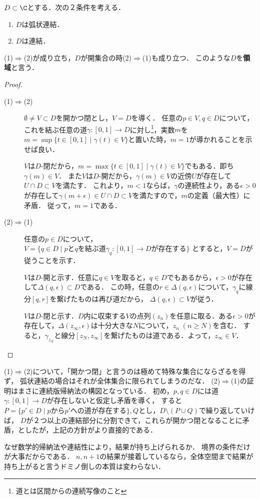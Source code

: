 \documentclass[uplatex, dvipdfmx]{jsreport}
\begin{document}
\begin{lemma}
    $D\subset\C$とする．次の２条件を考える．
    \begin{enumerate}[(1)]
        \item $D$は弧状連結．
        \item $D$は連結．
    \end{enumerate}
    (1)$\Rightarrow$(2)が成り立ち，$D$が開集合の時(2)$\Rightarrow$(1)も成り立つ．
    このような$D$を\textbf{領域}と言う．
\end{lemma}
\begin{proof}\mbox{}
    \begin{description}
        \item[(1)$\Rightarrow$(2)] 
        $\emptyset\ne V\subset D$を開かつ閉とし，$V=D$を導く．
        任意の$p\in V,q\in D$について，これを結ぶ任意の道$\gamma:[0,1]\to D$に対し\footnote{道とは区間からの連続写像のこと}，実数$m$を$m=\sup\{t\in[0,1]\mid\gamma(t)\in V\}$と置いた時，$m=1$が導かれることを示せば良い．

        $V$は$D$-閉だから，$m=\max\{t\in[0,1]\mid\gamma(t)\in V\}$でもある．即ち$\gamma(m)\in V$．
        また$V$は$D$-開だから，$\gamma(m)\in V$の近傍$U$が存在して$U\cap D\subset V$を満たす．
        これより，$m<1$ならば，$\gamma$の連続性より，ある$\epsilon>0$が存在して$\gamma(m+\epsilon)\in U\cap D\subset V$を満たすので，$m$の定義（最大性）に矛盾．
        従って，$m=1$である．
        \item[(2)$\Rightarrow$(1)] 
        任意の$p\in D$について，$V=\{q\in D\mid pとqを結ぶ道\gamma_q:[0,1]\to Dが存在する\}$
        とすると，$V=D$が従うことを示す．

        $V$は$D$-開と示す．任意に$q\in V$を取ると，$q\in D$でもあるから，$\epsilon>0$が存在して$\Delta(q,\epsilon)\subset D$である．
        この時，任意の$r\in\Delta(q,\epsilon)$について，$\gamma_q$に線分$[q,r]$を繋げたものは再び道だから，
        $\Delta(q,\epsilon)\subset V$が従う．

        $V$は$D$-閉と示す．$D$内に収束する$V$の点列$(z_n)$を任意に取る．ある$\epsilon>0$が存在して，$\Delta(z_\infty,\epsilon)$は十分大きな$N$について，$z_n\;(n\ge N)$を含む．
        すると，$\gamma_{z_N}$と線分$[z_N,z_\infty]$を繋げたものは道である．よって，$z_\infty\in V$．
    \end{description}
\end{proof}
\begin{remarks}
    (1)$\Rightarrow$(2)について，「開かつ閉」と言うのは極めて特殊な集合にならざるを得ず，
    弧状連結の場合はそれが全体集合に限られてしまうのだな．
    (2)$\Rightarrow$(1)の証明はまさに連続版帰納法の構図となっている．
    初め，$p,q\in D$には道$\gamma:[0,1]\to D$が存在しないと仮定し矛盾を導く，
    すると$P=\{p'\in D\mid pからp'への道が存在する\},Q$とし，$D\setminus (P\cup Q)$で繰り返していけば，
    $D$が２つ以上の連結部分に分割できて，これらが開かつ閉となることに矛盾，としたが，上記の方針がより直接的である．

    なぜ数学的帰納法や連結性により，結果が持ち上げられるか．
    境界の条件だけが大事だからである．
    $n,n+1$の結果が接着しているなら，全体空間まで結果が持ち上がると言うドミノ倒しの本質は変わらない．
\end{remarks}
\end{document}
